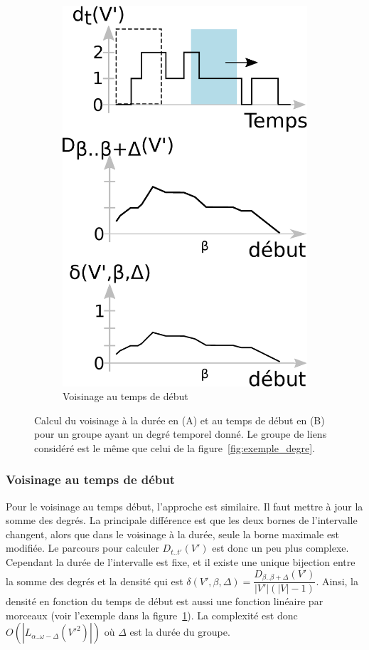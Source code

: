 \begin{figure}
\begin{subfigure}{0.4\textwidth}
		\includegraphics[width=0.8\linewidth]{img/GroupeDense/start_time.eps}
		\caption{Voisinage au temps de début}
		\label{fig:calcul_var_debut}
	\end{subfigure}\hspace*{0.05cm}

	\caption{Calcul du voisinage à la durée en (A) et au temps de début en (B) pour un groupe ayant un degré temporel donné. Le groupe de liens considéré est le même que celui de la figure~\ref{fig:exemple_degre}.}
	\label{fig:calcul_var_dure_debut.}
\end{figure}

\subsubsection{Voisinage au temps de début}
Pour le voisinage au temps début, l'approche est similaire.
Il faut mettre à jour la somme des degrés.
La principale différence est que les deux bornes de l'intervalle changent, alors que dans le voisinage à la durée, seule la borne maximale est modifiée.
Le parcours pour calculer $D_{t..t'}(V')$ est donc un peu plus complexe.
Cependant la durée de l'intervalle est fixe, et il existe une unique bijection entre la somme des degrés et la densité qui est $\delta(V',\beta, \Delta)= \dfrac{D_{\beta..\beta+\Delta}(V')}{|V'|(|V|-1)}$.
Ainsi, la densité en fonction du temps de début est aussi une fonction linéaire par morceaux (voir l'exemple dans la figure~\ref{fig:calcul_var_debut}).
La complexité est donc $O(|L_{\alpha..\omega-\Delta}(V'^2)|)$ où $\Delta$ est la durée du groupe.


